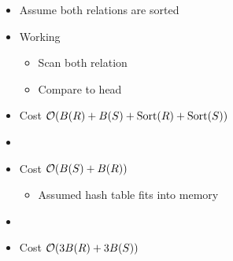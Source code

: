 \begin{itemize}
\begin{itemize}
\begin{itemize}
                    \item Assume both relations are sorted
                    \item Working
                        \begin{itemize}
                            \item Scan both relation
                            \item Compare to head
                        \end{itemize}
                    \item Cost $\mathcal{O}(B(R) + B(S) + \text{Sort}(R) + \text{Sort}(S))$
                \end{itemize}
                \begin{itemize}
                    \item {}
                    \item Cost $\mathcal{O}(B(S) + B(R))$
                        \begin{itemize}
                            \item Assumed hash table fits into memory
                        \end{itemize}
                \end{itemize}
                \begin{itemize}
                    \ipro Deals with the case where the hash table does not fit into memory
                    \item {}
                    \item Cost $\mathcal{O}(3B(R) + 3B(S))$
                \end{itemize}
        \end{itemize}
\end{itemize}

